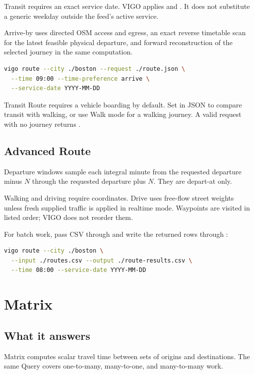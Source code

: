 \documentclass[10pt,letterpaper]{article}
\begin{document}
Transit requires an exact service date. VIGO applies  and . It does not substitute a generic weekday outside the feed's active service.

Arrive-by uses directed OSM access and egress, an exact reverse timetable scan for the latest feasible physical departure, and forward reconstruction of the selected journey in the same computation.

\begin{lstlisting}[language=bash]
vigo route --city ./boston --request ./route.json \
  --time 09:00 --time-preference arrive \
  --service-date YYYY-MM-DD
\end{lstlisting}

Transit Route requires a vehicle boarding by default. Set  in JSON to compare transit with walking, or use Walk mode for a walking journey. A valid request with no journey returns .

\subsection{Advanced Route}

Departure windows sample each integral minute from the requested departure minus $N$ through the requested departure plus $N$. They are depart-at only.

Walking and driving require coordinates. Drive uses free-flow street weights unless fresh supplied traffic is applied in realtime mode. Waypoints are visited in listed order; VIGO does not reorder them.

For batch work, pass CSV through \field{--input} and write the returned rows through \field{--output}:

\begin{lstlisting}[language=bash]
vigo route --city ./boston \
  --input ./routes.csv --output ./route-results.csv \
  --time 08:00 --service-date YYYY-MM-DD
\end{lstlisting}

\section{Matrix}

\subsection{What it answers}

Matrix computes scalar travel time between sets of origins and destinations. The same Query covers one-to-many, many-to-one, and many-to-many work.
\end{document}
